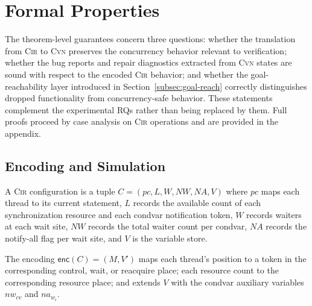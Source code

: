 \section{Formal Properties}
\label{sec:properties}

The theorem-level guarantees concern three questions: whether the
translation from \textsc{Cir} to \textsc{Cvn} preserves the concurrency
behavior relevant to verification; whether the bug reports and repair
diagnostics extracted from \textsc{Cvn} states are sound with respect
to the encoded \textsc{Cir} behavior; and whether the goal-reachability
layer introduced in Section~\ref{subsec:goal-reach} correctly
distinguishes dropped functionality from concurrency-safe behavior.
These statements complement the experimental RQs rather than being
replaced by them. Full proofs proceed by case analysis on \textsc{Cir}
operations and are provided in the appendix.

\subsection{Encoding and Simulation}
\label{subsec:encoding-simulation}

\begin{definition}
\label{def:cir-config}
A \textsc{Cir} configuration is a tuple
$C = (\mathit{pc}, L, W, \mathit{NW}, \mathit{NA}, V)$
where $\mathit{pc}$ maps each thread to its current statement,
$L$ records the available count of each synchronization resource and each condvar notification token, $W$ records waiters at each wait site, $\mathit{NW}$ records the total waiter count per condvar, $\mathit{NA}$ records the notify-all flag per wait site, and $V$ is the variable store.
\end{definition}

\begin{definition}[Encoding]
\label{def:encoding}
The encoding $\mathsf{enc}(C) = (M, V')$ maps each thread's
position to a token in the corresponding control, wait, or
reacquire place; each resource count to the corresponding resource place; and extends $V$ with the condvar auxiliary variables $\mathit{nw}_{\mathit{cv}}$ and $\mathit{na}_{w_i}$.
\end{definition}

